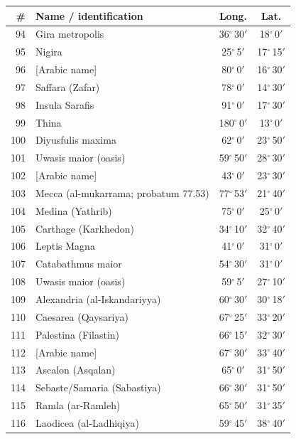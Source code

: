 \documentclass[10pt,a4paper]{article}
\begin{document}
\begin{longtable}{r >{\raggedright\arraybackslash}p{8.5cm} c c}
\toprule \# & Name / identification & Long. & Lat.\\ \midrule\endhead
94 & Gira metropolis & 36$^\circ$\,30$'$ & 18$^\circ$\,0$'$\\
95 & Nigira & 25$^\circ$\,5$'$ & 17$^\circ$\,15$'$\\
96 & {[}Arabic name{]} & 80$^\circ$\,0$'$ & 16$^\circ$\,30$'$\\
97 & Saffara (Zafar) & 78$^\circ$\,0$'$ & 14$^\circ$\,30$'$\\
98 & Insula Sarafis & 91$^\circ$\,0$'$ & 17$^\circ$\,30$'$\\
99 & Thina & 180$^\circ$\,0$'$ & 13$^\circ$\,0$'$\\
100 & Diyusfulis maxima & 62$^\circ$\,0$'$ & 23$^\circ$\,50$'$\\
101 & Uwasis maior (oasis) & 59$^\circ$\,50$'$ & 28$^\circ$\,30$'$\\
102 & {[}Arabic name{]} & 43$^\circ$\,0$'$ & 23$^\circ$\,30$'$\\
103 & Mecca (al-mukarrama; probatum 77.53) & 77$^\circ$\,53$'$ & 21$^\circ$\,40$'$\\
104 & Medina (Yathrib) & 75$^\circ$\,0$'$ & 25$^\circ$\,0$'$\\
105 & Carthage (Karkhedon) & 34$^\circ$\,10$'$ & 32$^\circ$\,40$'$\\
106 & Leptis Magna & 41$^\circ$\,0$'$ & 31$^\circ$\,0$'$\\
107 & Catabathmus maior & 54$^\circ$\,30$'$ & 31$^\circ$\,0$'$\\
108 & Uwasis maior (oasis) & 59$^\circ$\,5$'$ & 27$^\circ$\,10$'$\\
109 & Alexandria (al-Iskandariyya) & 60$^\circ$\,30$'$ & 30$^\circ$\,18$'$\\
110 & Caesarea (Qaysariya) & 67$^\circ$\,25$'$ & 33$^\circ$\,20$'$\\
111 & Palestina (Filastin) & 66$^\circ$\,15$'$ & 32$^\circ$\,30$'$\\
112 & {[}Arabic name{]} & 67$^\circ$\,30$'$ & 33$^\circ$\,40$'$\\
113 & Ascalon (Asqalan) & 65$^\circ$\,0$'$ & 31$^\circ$\,50$'$\\
114 & Sebaste/Samaria (Sabastiya) & 66$^\circ$\,30$'$ & 31$^\circ$\,50$'$\\
115 & Ramla (ar-Ramleh) & 65$^\circ$\,50$'$ & 31$^\circ$\,35$'$\\
116 & Laodicea (al-Ladhiqiya) & 59$^\circ$\,45$'$ & 38$^\circ$\,40$'$\\

\end{longtable}
\end{document}
